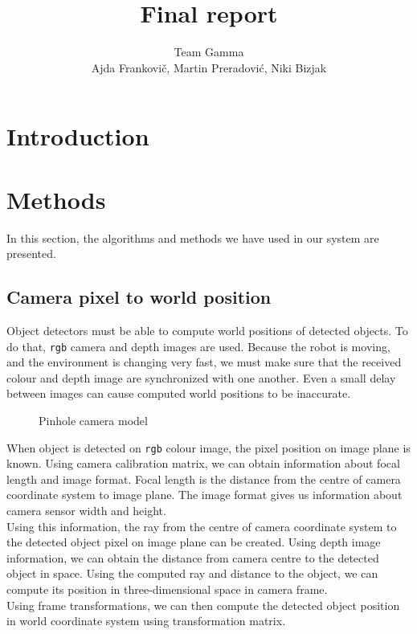 \documentclass[12pt,a4paper]{article}
\author{Team Gamma \\ {\small Ajda Frankovič, Martin Preradović, Niki Bizjak}}
\title{Final report}
\date{}
\begin{document}
	
	\maketitle
	
	\section{Introduction}
	
	\section{Methods}
	In this section, the algorithms and methods we have used in our system are presented.
	
	\subsection{Camera pixel to world position}
	Object detectors must be able to compute world positions of detected objects. To do that, \texttt{rgb} camera and depth images are used. Because the robot is moving, and the environment is changing very fast, we must make sure that the received colour and depth image are synchronized with one another. Even a small delay between images can cause computed world positions to be inaccurate. \\
	
	\begin{figure}[h]
		\centering
		\caption{Pinhole camera model}
		\label{fig:pinhole_camera_model}
	\end{figure}
	
	When object is detected on \texttt{rgb} colour image, the pixel position on image plane is known. Using camera calibration matrix, we can obtain information about focal length and image format. Focal length is the distance from the centre of camera coordinate system to image plane. The image format gives us information about camera sensor width and height. \\
	
	Using this information, the ray from the centre of camera coordinate system to the detected object pixel on image plane can be created. Using depth image information, we can obtain the distance from camera centre to the detected object in space. Using the computed ray and distance to the object, we can compute its position in three-dimensional space in camera frame. \\
	
	Using frame transformations, we can then compute the detected object position in world coordinate system using transformation matrix. \\
	
\end{document}
